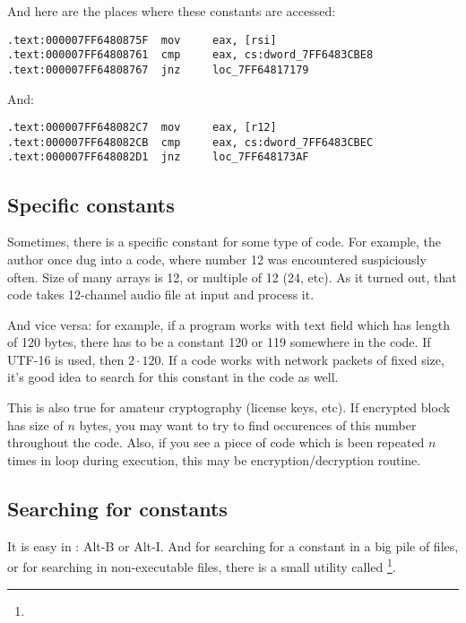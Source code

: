And here are the places where these constants are accessed:

\begin{lstlisting}[caption=dhcpcore.dll (Windows 7 x64),style=customasm]
.text:000007FF6480875F  mov     eax, [rsi]
.text:000007FF64808761  cmp     eax, cs:dword_7FF6483CBE8
.text:000007FF64808767  jnz     loc_7FF64817179
\end{lstlisting}

And:

\begin{lstlisting}[caption=dhcpcore.dll (Windows 7 x64),style=customasm]
.text:000007FF648082C7  mov     eax, [r12]
.text:000007FF648082CB  cmp     eax, cs:dword_7FF6483CBEC
.text:000007FF648082D1  jnz     loc_7FF648173AF
\end{lstlisting}

\subsection{Specific constants}

Sometimes, there is a specific constant for some type of code.
For example, the author once dug into a code, where number 12 was encountered suspiciously often.
Size of many arrays is 12, or multiple of 12 (24, etc).
As it turned out, that code takes 12-channel audio file at input and process it.

And vice versa: for example, if a program works with text field which has length of 120 bytes,
there has to be a constant 120 or 119 somewhere in the code.
If UTF-16 is used, then $2 \cdot 120$.
If a code works with network packets of fixed size, it's good idea to search for this constant in the code as well.

This is also true for amateur cryptography (license keys, etc).
If encrypted block has size of $n$ bytes, you may want to try to find occurences of this number throughout the code.
Also, if you see a piece of code which is been repeated $n$ times in loop during execution,
this may be encryption/decryption routine.

\subsection{Searching for constants}

It is easy in \IDA: Alt-B or Alt-I.
And for searching for a constant in a big pile of files, or for searching in non-executable files,
there is a small utility called \footnote{\BGREPURL}.

